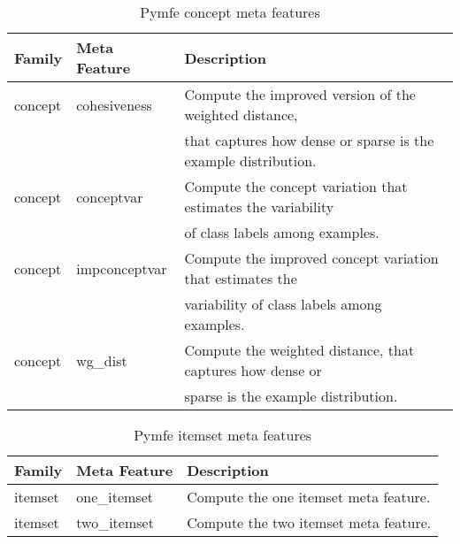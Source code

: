    \begin{table}[h!]
    \centering
    \caption{Pymfe concept meta features}
    \setlength{\tabcolsep}{8pt}
      \renewcommand{\arraystretch}{1.2}
        \begin{tabular}{lll}
          \hline
          Family & Meta Feature & Description \\ \hline
        concept & cohesiveness & Compute the improved version of the weighted distance,\\ & & that captures how dense or sparse is the example distribution.\\
        concept & conceptvar & Compute the concept variation that estimates the variability\\ & & of class labels among examples.\\
        concept & impconceptvar & Compute the improved concept variation that estimates the\\ & & variability of class labels among examples.\\
        concept & wg\_dist & Compute the weighted distance, that captures how dense or\\ & & sparse is the example distribution.\\\hline
    \end{tabular}
    \label{tab:pymfe-concept-mf}
  \end{table}

  \begin{table}[h!]
    \centering
    \caption{Pymfe itemset meta features}
    \setlength{\tabcolsep}{8pt}
      \renewcommand{\arraystretch}{1.2}
        \begin{tabular}{lll}
          \hline
          Family & Meta Feature & Description \\ \hline
          itemset & one\_itemset & Compute the one itemset meta feature.\\          
          itemset & two\_itemset & Compute the two itemset meta feature.\\\hline

    \end{tabular}
    \label{tab:pymfe-itemset-mf}
  \end{table}

